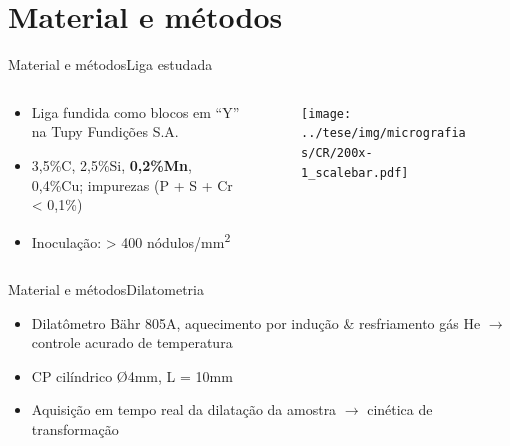 \section{Material e métodos}

\begin{frame}{Material e métodos}{Liga estudada}
  \begin{columns}
    \begin{column}{.6\textwidth}
      \begin{itemize}
        \item Liga fundida como blocos em ``Y'' na Tupy Fundições S.A.
        \item 3,5\%C, 2,5\%Si, \textbf{0,2\%Mn}, 0,4\%Cu; impurezas (P + S + Cr < 0,1\%)
        \item Inoculação: > 400 nódulos/mm\textsuperscript{2}
      \end{itemize}
    \end{column}

    \begin{column}{.4\textwidth}
      \begin{figure}
        \texttt{[image: ../tese/img/micrografias/CR/200x-1\_scalebar.pdf]}
      \end{figure}
    \end{column}
  \end{columns}
\end{frame}

\begin{frame}{Material e métodos}{Dilatometria}
  \begin{itemize}
    \item Dilatômetro Bähr 805A, aquecimento por indução \& resfriamento gás He $\rightarrow$ controle acurado de temperatura
    \item CP cilíndrico \O 4mm, L = 10mm
    \item Aquisição em tempo real da dilatação da amostra $\rightarrow$ cinética de transformação
  \end{itemize}
\end{frame}

